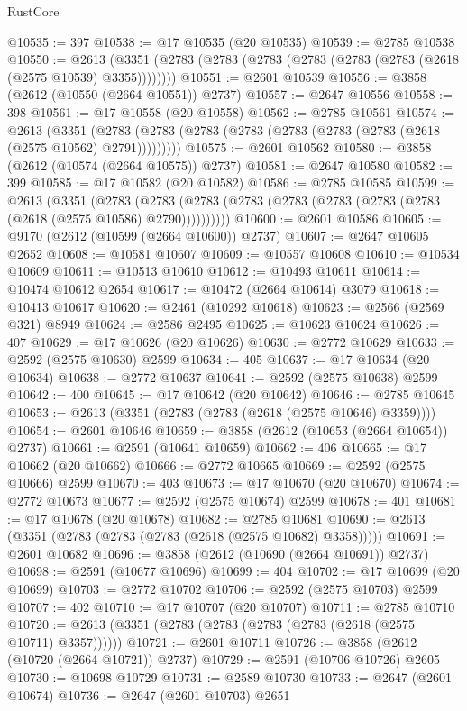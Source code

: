 \begin{lexlean}{RustCore}
\begin{coremodule}
@10535 := 397
@10538 := @17 @10535 (@20 @10535)
@10539 := @2785 @10538
@10550 := @2613 (@3351 (@2783 (@2783 (@2783 (@2783 (@2783 (@2783 (@2618 (@2575 @10539) @3355))))))))
@10551 := @2601 @10539
@10556 := @3858 (@2612 (@10550 (@2664 @10551)) @2737)
@10557 := @2647 @10556
@10558 := 398
@10561 := @17 @10558 (@20 @10558)
@10562 := @2785 @10561
@10574 := @2613
    (@3351 (@2783 (@2783 (@2783 (@2783 (@2783 (@2783 (@2783 (@2618 (@2575 @10562) @2791)))))))))
@10575 := @2601 @10562
@10580 := @3858 (@2612 (@10574 (@2664 @10575)) @2737)
@10581 := @2647 @10580
@10582 := 399
@10585 := @17 @10582 (@20 @10582)
@10586 := @2785 @10585
@10599 := @2613
    (@3351
      (@2783 (@2783 (@2783 (@2783 (@2783 (@2783 (@2783 (@2783 (@2618 (@2575 @10586) @2790))))))))))
@10600 := @2601 @10586
@10605 := @9170 (@2612 (@10599 (@2664 @10600)) @2737)
@10607 := @2647 @10605 @2652
@10608 := @10581 @10607
@10609 := @10557 @10608
@10610 := @10534 @10609
@10611 := @10513 @10610
@10612 := @10493 @10611
@10614 := @10474 @10612 @2654
@10617 := @10472 (@2664 @10614) @3079
@10618 := @10413 @10617
@10620 := @2461 (@10292 @10618)
@10623 := @2566 (@2569 @321) @8949
@10624 := @2586 @2495
@10625 := @10623 @10624
@10626 := 407
@10629 := @17 @10626 (@20 @10626)
@10630 := @2772 @10629
@10633 := @2592 (@2575 @10630) @2599
@10634 := 405
@10637 := @17 @10634 (@20 @10634)
@10638 := @2772 @10637
@10641 := @2592 (@2575 @10638) @2599
@10642 := 400
@10645 := @17 @10642 (@20 @10642)
@10646 := @2785 @10645
@10653 := @2613 (@3351 (@2783 (@2783 (@2618 (@2575 @10646) @3359))))
@10654 := @2601 @10646
@10659 := @3858 (@2612 (@10653 (@2664 @10654)) @2737)
@10661 := @2591 (@10641 @10659)
@10662 := 406
@10665 := @17 @10662 (@20 @10662)
@10666 := @2772 @10665
@10669 := @2592 (@2575 @10666) @2599
@10670 := 403
@10673 := @17 @10670 (@20 @10670)
@10674 := @2772 @10673
@10677 := @2592 (@2575 @10674) @2599
@10678 := 401
@10681 := @17 @10678 (@20 @10678)
@10682 := @2785 @10681
@10690 := @2613 (@3351 (@2783 (@2783 (@2783 (@2618 (@2575 @10682) @3358)))))
@10691 := @2601 @10682
@10696 := @3858 (@2612 (@10690 (@2664 @10691)) @2737)
@10698 := @2591 (@10677 @10696)
@10699 := 404
@10702 := @17 @10699 (@20 @10699)
@10703 := @2772 @10702
@10706 := @2592 (@2575 @10703) @2599
@10707 := 402
@10710 := @17 @10707 (@20 @10707)
@10711 := @2785 @10710
@10720 := @2613 (@3351 (@2783 (@2783 (@2783 (@2783 (@2618 (@2575 @10711) @3357))))))
@10721 := @2601 @10711
@10726 := @3858 (@2612 (@10720 (@2664 @10721)) @2737)
@10729 := @2591 (@10706 @10726) @2605
@10730 := @10698 @10729
@10731 := @2589 @10730
@10733 := @2647 (@2601 @10674)
@10736 := @2647 (@2601 @10703) @2651

\end{coremodule}
\end{lexlean}
